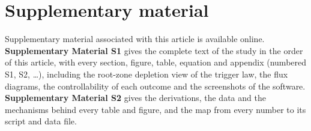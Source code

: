 \documentclass[review,12pt,authoryear]{elsarticle}
\begin{document}
\section*{Supplementary material}
Supplementary material associated with this article is available online. \textbf{Supplementary Material S1} gives the complete text of the study in the order of this article, with every section, figure, table, equation and appendix (numbered S1, S2, \ldots), including the root-zone depletion view of the trigger law, the flux diagrams, the controllability of each outcome and the screenshots of the software. \textbf{Supplementary Material S2} gives the derivations, the data and the mechanisms behind every table and figure, and the map from every number to its script and data file.



\end{document}
